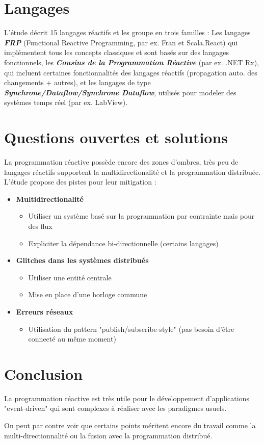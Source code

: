 \documentclass[10pt,final]{IEEEtran}
\begin{document}
\section{Langages}

L'étude décrit 15 langages réactifs et les groupe en trois familles : Les langages \textit{\textbf{FRP}} (Functional Reactive Programming, par ex. Fran et Scala.React) qui implémentent tous les concepts classiques et sont basés sur des langages fonctionnels, les \textit{\textbf{Cousins de la Programmation Réactive}} (par ex. .NET Rx), qui incluent certaines fonctionnalités des langages réactifs (propagation auto. des changements + autres), et les langages de type \textit{\textbf{Synchrone/Dataflow/Synchrone Dataflow}}, utilisés pour modeler des systèmes temps réel (par ex. LabView). 

\section{Questions ouvertes et solutions}

La programmation réactive possède encore des zones d'ombres, très peu de langages réactifs
supportent la multidirectionalité et la programmation distribuée. L'étude propose des pistes pour leur mitigation :
\begin{itemize}
    \item \textbf{Multidirectionalité}
        \begin{itemize}
            \item Utiliser un système basé sur la programmation par contrainte mais pour des flux
            \item Expliciter la dépendance bi-directionnelle (certains langages)
        \end{itemize}
    \item \textbf{Glitches dans les systèmes distribués}
        \begin{itemize}
            \item Utiliser une entité centrale
            \item Mise en place d'une horloge commune
        \end{itemize}
    \item \textbf{Erreurs réseaux}
        \begin{itemize}
            \item Utilisation du pattern "publish/subscribe-style" (pas besoin d'être connecté au même moment)
        \end{itemize}
\end{itemize}

\section{Conclusion}

La programmation réactive est très utile pour le développement d'applications "event-driven" qui
sont complexes à réaliser avec les paradigmes usuels.


On peut par contre voir que certains points méritent encore du travail comme la
multi-directionnalité ou la fusion avec la programmation distribué.
\end{document}
